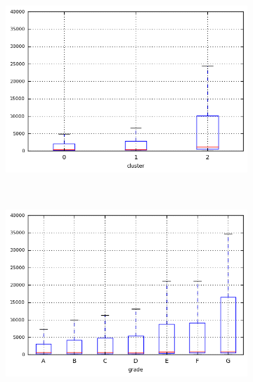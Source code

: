 \begin{anexosenv}
\begin{figure}[ht!]
\begin{subfigure}[t]{0.45\textwidth}
        \end{subfigure}
\end{figure}



\begin{figure}[ht!]
    \centering
                \caption{\emph{Boxplots} de last\textunderscore pymnt\textunderscore amnt}
        \begin{subfigure}[t]{0.45\textwidth}
            \centering

            \centerline{\includegraphics[width=1.05\textwidth]{img/last_pymnt_amnt_by_cluster}}
        \end{subfigure}%
        ~ 
        \begin{subfigure}[t]{0.45\textwidth}
            \centering
   
            \centerline{\includegraphics[width=1.05\textwidth]{img/last_pymnt_amnt_by_grade}}


\end{subfigure}
\end{figure}
\end{anexosenv}
